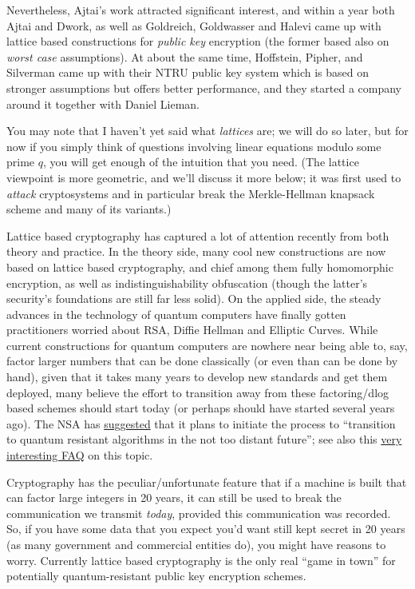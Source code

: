 Nevertheless, Ajtai's work attracted significant interest, and within a
year both Ajtai and Dwork, as well as Goldreich, Goldwasser and Halevi
came up with lattice based constructions for \emph{public key}
encryption (the former based also on \emph{worst case} assumptions). At
about the same time, Hoffstein, Pipher, and Silverman came up with their
NTRU public key system which is based on stronger assumptions but offers
better performance, and they started a company around it together with
Daniel Lieman.

You may note that I haven't yet said what \emph{lattices} are; we will
do so later, but for now if you simply think of questions involving
linear equations modulo some prime \(q\), you will get enough of the
intuition that you need. (The lattice viewpoint is more geometric, and
we'll discuss it more below; it was first used to \emph{attack}
cryptosystems and in particular break the Merkle-Hellman knapsack scheme
and many of its variants.)

Lattice based cryptography has captured a lot of attention recently from
both theory and practice. In the theory side, many cool new
constructions are now based on lattice based cryptography, and chief
among them fully homomorphic encryption, as well as indistinguishability
obfuscation (though the latter's security's foundations are still far
less solid). On the applied side, the steady advances in the technology
of quantum computers have finally gotten practitioners worried about
RSA, Diffie Hellman and Elliptic Curves. While current constructions for
quantum computers are nowhere near being able to, say, factor larger
numbers that can be done classically (or even than can be done by hand),
given that it takes many years to develop new standards and get them
deployed, many believe the effort to transition away from these
factoring/dlog based schemes should start today (or perhaps should have
started several years ago). The NSA has
\href{https://www.nsa.gov/ia/programs/suiteb_cryptography/index.shtml}{suggested}
that it plans to initiate the process to ``transition to quantum
resistant algorithms in the not too distant future''; see also this
\href{https://cryptome.org/2016/01/CNSA-Suite-and-Quantum-Computing-FAQ.pdf}{very
interesting FAQ} on this topic.

Cryptography has the peculiar/unfortunate feature that if a machine is
built that can factor large integers in 20 years, it can still be used
to break the communication we transmit \emph{today}, provided this
communication was recorded. So, if you have some data that you expect
you'd want still kept secret in 20 years (as many government and
commercial entities do), you might have reasons to worry. Currently
lattice based cryptography is the only real ``game in town'' for
potentially quantum-resistant public key encryption schemes.

